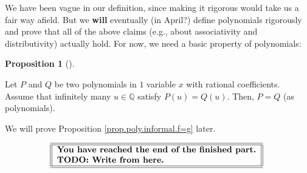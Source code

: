 \documentclass[numbers=enddot,12pt,final,onecolumn,notitlepage]{scrartcl}%
\numberwithin{exer}{subsection}
\theoremstyle{definition}
\newtheorem{prop}[theo]{Proposition}
\newenvironment{proposition}[1][]
{\begin{prop}[#1]\begin{leftbar}}
{\end{leftbar}\end{prop}}
\begin{document}
We have been vague in our definition, since making it rigorous would take us a
fair way afield. But we \textbf{will} eventually (in April?) define
polynomials rigorously and prove that all of the above claims (e.g., about
associativity and distributivity) actually hold. For now, we need a basic
property of polynomials:

\begin{proposition}
\label{prop.poly.informal.f=g}Let $P$ and $Q$ be two polynomials in $1$
variable $x$ with rational coefficients. Assume that infinitely many
$u\in\mathbb{Q}$ satisfy $P\left(  u\right)  =Q\left(  u\right)  $. Then,
$P=Q$ (as polynomials).
\end{proposition}

We will prove Proposition \ref{prop.poly.informal.f=g} later.%

\[%
\begin{tabular}
[c]{||l||}\hline\hline
\textbf{You have reached the end of the finished part.}\\
\textbf{TODO: Write from here.}\\\hline\hline
\end{tabular}
\
\]
\end{document}
